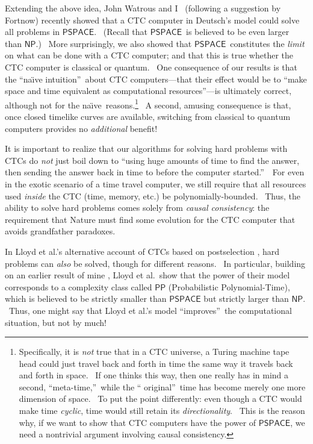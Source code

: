 \documentclass[12pt,onecolumn]{article}%
\begin{document}
Extending the above idea, John Watrous and I \cite{awat}\ (following a
suggestion by Fortnow) recently showed that a CTC computer in Deutsch's model
could solve all problems in $\mathsf{PSPACE}$. \ (Recall that $\mathsf{PSPACE}%
$\ is believed to be even larger than $\mathsf{NP}$.) \ More surprisingly, we
also showed that $\mathsf{PSPACE}$\ constitutes the \textit{limit} on what can
be done with a CTC computer; and that this is true whether the CTC computer is
classical or quantum. \ One consequence of our results is that the
\textquotedblleft na\"{\i}ve intuition\textquotedblright\ about CTC
computers---that their effect would be to \textquotedblleft make space and
time equivalent as computational resources\textquotedblright---is ultimately
correct, although not for the na\"{\i}ve\ reasons.\footnote{Specifically, it
is \textit{not} true that in a CTC universe, a Turing machine tape head could
just travel back and forth in time the same way it travels back and forth in
space. \ If one thinks this way, then one really has in mind a second,
\textquotedblleft meta-time,\textquotedblright\ while the \textquotedblleft
original\textquotedblright\ time has become merely one more dimension of
space. \ To put the point differently: even though a CTC would make time
\textit{cyclic}, time would still retain its \textit{directionality}. \ This
is the reason why, if we want to show that CTC computers have the power of
$\mathsf{PSPACE}$, we need a nontrivial argument involving causal
consistency.} \ A second, amusing consequence is that, once closed timelike
curves are available, switching from classical to quantum computers provides
no \textit{additional} benefit!

It is important to realize that our algorithms for solving hard problems with
CTCs do \textit{not} just boil down to \textquotedblleft using huge amounts of
time to find the answer, then sending the answer back in time to before the
computer started.\textquotedblright\ \ For even in the exotic scenario of a
time travel computer, we still require that all resources used \textit{inside}
the CTC (time, memory, etc.) be polynomially-bounded. \ Thus, the ability to
solve hard problems comes solely from \textit{causal consistency}: the
requirement that Nature must find some evolution for the CTC computer that
avoids grandfather paradoxes.

In Lloyd et al.'s alternative account of CTCs based on postselection
\cite{lmggs}, hard problems can \textit{also} be solved, though for different
reasons. \ In particular, building on an earlier result of mine \cite{aar:pp},
Lloyd et al.\ show that the power of their model corresponds to a complexity
class called $\mathsf{PP}$ (Probabilistic Polynomial-Time), which is believed
to be strictly smaller than $\mathsf{PSPACE}$ but strictly larger than
$\mathsf{NP}$. \ Thus, one might say that Lloyd et al.'s model
\textquotedblleft improves\textquotedblright\ the computational situation, but
not by much!
\end{document}
